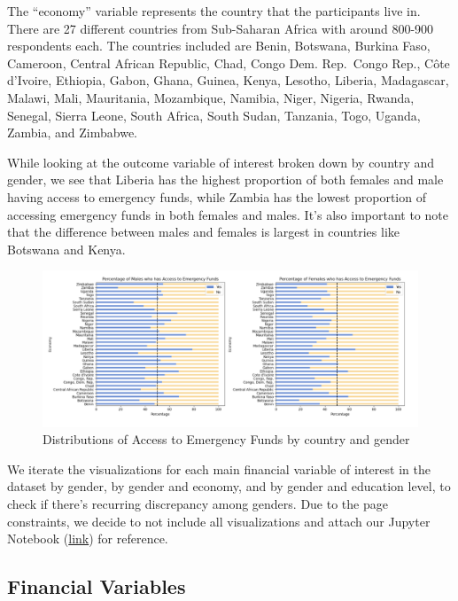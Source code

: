 \documentclass[12pt]{article}
\begin{document}
The ``economy'' variable represents the country that the participants
live in. There are 27 different countries from Sub-Saharan Africa with
around 800-900 respondents each. The countries included are Benin,
Botswana, Burkina Faso, Cameroon, Central African Republic, Chad, Congo
Dem. Rep.~Congo Rep., Côte d'Ivoire, Ethiopia, Gabon, Ghana, Guinea,
Kenya, Lesotho, Liberia, Madagascar, Malawi, Mali, Mauritania,
Mozambique, Namibia, Niger, Nigeria, Rwanda, Senegal, Sierra Leone,
South Africa, South Sudan, Tanzania, Togo, Uganda, Zambia, and Zimbabwe.

While looking at the outcome variable of interest broken down by country
and gender, we see that Liberia has the highest proportion of both
females and male having access to emergency funds, while Zambia has the
lowest proportion of accessing emergency funds in both females and
males. It's also important to note that the difference between males and
females is largest in countries like Botswana and Kenya.

\begin{figure}

{\centering \includegraphics[width=1\linewidth]{graphs/country_graph10} 

}

\caption{Distributions of Access to Emergency Funds by country and gender}\label{fig:unnamed-chunk-13}
\end{figure}

We iterate the visualizations for each main financial variable of
interest in the dataset by gender, by gender and economy, and by gender
and education level, to check if there's recurring discrepancy among
genders. Due to the page constraints, we decide to not include all
visualizations and attach our Jupyter Notebook
(\href{https://drive.google.com/file/d/1f9AauOn4I2Rl5io_viMw0WbEXKFiJcRA/view?usp=sharing}{link})
for reference.

\hypertarget{financial-variables}{%
\subsection{Financial Variables}\label{financial-variables}}
\end{document}
